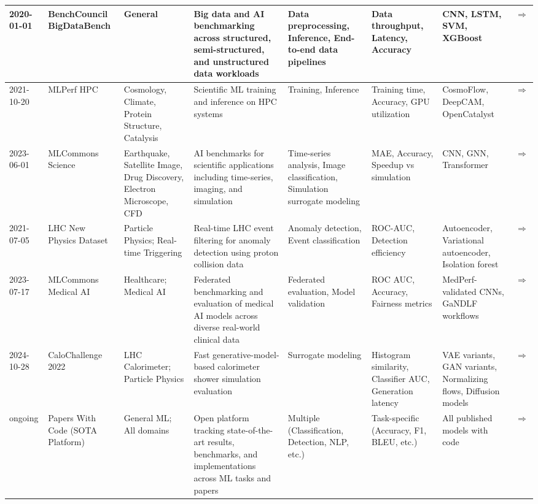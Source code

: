 \documentclass{article}
\begin{document}
\begin{landscape}
{\begin{longtable}{|p{1.5cm}|p{2.5cm}|p{2cm}|p{2cm}|p{3cm}|p{2cm}|p{2cm}|p{1cm}|}
2020-01-01 & BenchCouncil BigDataBench & General & Big data and AI benchmarking across structured, semi-structured, and unstructured data workloads & Data preprocessing, Inference, End-to-end data pipelines & Data throughput, Latency, Accuracy & CNN, LSTM, SVM, XGBoost & \cite{gao2018bigdatabench} \href{https://arxiv.org/abs/1802.08254}{$\Rightarrow$ } \\ \hline
2021-10-20 & MLPerf HPC & Cosmology, Climate, Protein Structure, Catalysis & Scientific ML training and inference on HPC systems & Training, Inference & Training time, Accuracy, GPU utilization & CosmoFlow, DeepCAM, OpenCatalyst & \cite{farrell2021mlperf} \href{https://arxiv.org/abs/2110.11466}{$\Rightarrow$ } \\ \hline
2023-06-01 & MLCommons Science & Earthquake, Satellite Image, Drug Discovery, Electron Microscope, CFD & AI benchmarks for scientific applications including time-series, imaging, and simulation & Time-series analysis, Image classification, Simulation surrogate modeling & MAE, Accuracy, Speedup vs simulation & CNN, GNN, Transformer & \cite{mlcommons_science2023} \href{https://github.com/mlcommons/science}{$\Rightarrow$ } \\ \hline
2021-07-05 & LHC New Physics Dataset & Particle Physics; Real-time Triggering & Real-time LHC event filtering for anomaly detection using proton collision data & Anomaly detection, Event classification & ROC-AUC, Detection efficiency & Autoencoder, Variational autoencoder, Isolation forest & \cite{govorkova2022lhcnewphysics} \href{https://doi.org/10.5281/zenodo.5046389}{$\Rightarrow$ } \\ \hline
2023-07-17 & MLCommons Medical AI & Healthcare; Medical AI & Federated benchmarking and evaluation of medical AI models across diverse real-world clinical data & Federated evaluation, Model validation & ROC AUC, Accuracy, Fairness metrics & MedPerf-validated CNNs, GaNDLF workflows & \cite{karargyris2023federated} \href{https://www.nature.com/articles/s42256-023-00652-2}{$\Rightarrow$ } \\ \hline
2024-10-28 & CaloChallenge 2022 & LHC Calorimeter; Particle Physics & Fast generative-model-based calorimeter shower simulation evaluation & Surrogate modeling & Histogram similarity, Classifier AUC, Generation latency & VAE variants, GAN variants, Normalizing flows, Diffusion models & \cite{krause2024calochallenge} \href{https://arxiv.org/abs/2410.21611}{$\Rightarrow$ } \\ \hline
ongoing & Papers With Code (SOTA Platform) & General ML; All domains & Open platform tracking state-of-the-art results, benchmarks, and implementations across ML tasks and papers & Multiple (Classification, Detection, NLP, etc.) & Task-specific (Accuracy, F1, BLEU, etc.) & All published models with code & \cite{pwc2025} \href{https://paperswithcode.com}{$\Rightarrow$ } \\ \hline

\end{longtable}}
\end{landscape}
\end{document}
